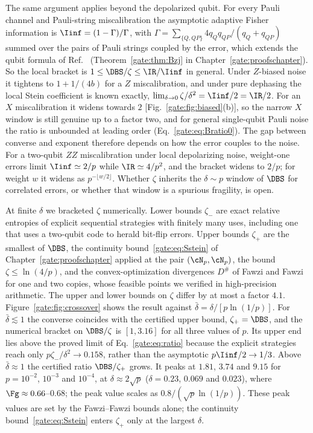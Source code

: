 The same argument applies beyond the depolarized qubit. For every Pauli channel and Pauli-string miscalibration the asymptotic adaptive Fisher information is $\Iinf=(1-\Gamma)/\Gamma$, with $\Gamma=\sum_{\{Q,QP\}}4q_Qq_{QP}/(q_Q+q_{QP})$ summed over the pairs of Pauli strings coupled by the error, which extends the qubit formula of Ref.~\cite{ZhouJiang2021} (Theorem~\ref{gate:thm:Bzj} in Chapter~\ref{gate:proofschapter}). So the local bracket is $1\le\DBS/\zeta\le\IR/\Iinf$ in general. Under $Z$-biased noise it tightens to $1+1/(4b)$ for a $Z$ miscalibration, and under pure dephasing the local Stein coefficient is known exactly, $\lim_{\delta\to0}\zeta/\delta^2=\Iinf/2=\IR/2$. For an $X$ miscalibration it widens towards $2$ [Fig.~\ref{gate:fig:biased}(b)], so the narrow $X$ window is still genuine up to a factor two, and for general single-qubit Pauli noise the ratio is unbounded at leading order (Eq.~\eqref{gate:eq:Bratio0}). The gap between converse and exponent therefore depends on how the error couples to the noise. For a two-qubit $ZZ$ miscalibration under local depolarizing noise, weight-one errors limit $\Iinf\simeq2/p$ while $\IR\simeq4/p^2$, and the bracket widens to $2/p$; for weight $w$ it widens as $p^{-\lfloor w/2\rfloor}$. Whether $\zeta$ inherits the $\delta\sim p$ window of $\DBS$ for correlated errors, or whether that window is a spurious fragility, is open.

At finite $\delta$ we bracketed $\zeta$ numerically. Lower bounds $\zeta_-$ are exact relative entropies of explicit sequential strategies with finitely many uses, including one that uses a two-qubit code to herald bit-flip errors. Upper bounds $\zeta_+$ are the smallest of $\DBS$, the continuity bound~\eqref{gate:eq:Sstein} of Chapter~\ref{gate:proofschapter} applied at the pair $(\cN_p,\cN_p)$, the bound $\zeta\le\ln(4/p)$, and the convex-optimization divergences $D^\#$ of Fawzi and Fawzi~\cite{FawziFawzi2021} for one and two copies, whose feasible points we verified in high-precision arithmetic. The upper and lower bounds on $\zeta$ differ by at most a factor $4.1$. Figure~\ref{gate:fig:crossover} shows the result against $\bar\delta=\delta/[p\ln(1/p)]$. For $\bar\delta\lesssim1$ the converse coincides with the certified upper bound, $\zeta_+=\DBS$, and the numerical bracket on $\DBS/\zeta$ is $[1,3.16]$ for all three values of $p$. Its upper end lies above the proved limit of Eq.~\eqref{gate:eq:ratio} because the explicit strategies reach only $p\zeta_-/\delta^2\to0.158$, rather than the asymptotic $p\Iinf/2\to1/3$. Above $\bar\delta\approx1$ the certified ratio $\DBS/\zeta_+$ grows. It peaks at $1.81$, $3.74$ and $9.15$ for $p=10^{-2}$, $10^{-3}$ and $10^{-4}$, at $\delta\approx2\sqrt p$ ($\delta=0.23$, $0.069$ and $0.023$), where $\Fg\approx0.66$--$0.68$; the peak value scales as $0.8/(\sqrt p\ln(1/p))$. These peak values are set by the Fawzi--Fawzi bounds alone; the continuity bound~\eqref{gate:eq:Sstein} enters $\zeta_+$ only at the largest $\delta$.

